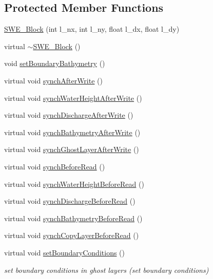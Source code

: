 \subsection*{Protected Member Functions}
\begin{DoxyCompactItemize}
\item 
\hyperlink{classSWE__Block_a114ed3bb6a8a2c482e5f94f768543b82}{S\-W\-E\-\_\-\-Block} (int l\-\_\-nx, int l\-\_\-ny, float l\-\_\-dx, float l\-\_\-dy)
\item 
virtual \hyperlink{classSWE__Block_a2ddff1c284663ba514985a3574def1b0}{$\sim$\-S\-W\-E\-\_\-\-Block} ()
\item 
void \hyperlink{classSWE__Block_a6beb68dacde9c8479647c25c6a5cbcf5}{set\-Boundary\-Bathymetry} ()
\item 
virtual void \hyperlink{classSWE__Block_ae914f9bf6d4ef8f974f9f005114985e7}{synch\-After\-Write} ()
\item 
virtual void \hyperlink{classSWE__Block_aa2924833e29a795d8c04fb79bfe794de}{synch\-Water\-Height\-After\-Write} ()
\item 
virtual void \hyperlink{classSWE__Block_a94c34030153178c9d94f3f14be174eaf}{synch\-Discharge\-After\-Write} ()
\item 
virtual void \hyperlink{classSWE__Block_a4bece8aa90f67e55c40b91aab900febb}{synch\-Bathymetry\-After\-Write} ()
\item 
virtual void \hyperlink{classSWE__Block_a4657993ebdb5f0132b077e63790d0b2b}{synch\-Ghost\-Layer\-After\-Write} ()
\item 
virtual void \hyperlink{classSWE__Block_a23d936cb9a4367092e5b2515f81fe819}{synch\-Before\-Read} ()
\item 
virtual void \hyperlink{classSWE__Block_a07c85681ab29106c3b164db969899ace}{synch\-Water\-Height\-Before\-Read} ()
\item 
virtual void \hyperlink{classSWE__Block_a3773dcb194212fb8cb40ab8465575aa1}{synch\-Discharge\-Before\-Read} ()
\item 
virtual void \hyperlink{classSWE__Block_a7c8258c6949518ca44f4e9ce89d33b09}{synch\-Bathymetry\-Before\-Read} ()
\item 
virtual void \hyperlink{classSWE__Block_a13c90d5a6596336013c41e73c8795f83}{synch\-Copy\-Layer\-Before\-Read} ()
\item 
virtual void \hyperlink{classSWE__Block_a379807f0bf932b40aeb42065633fce60}{set\-Boundary\-Conditions} ()
\begin{DoxyCompactList}\small\item\em set boundary conditions in ghost layers (set boundary conditions) \end{DoxyCompactList}\end{DoxyCompactItemize}
